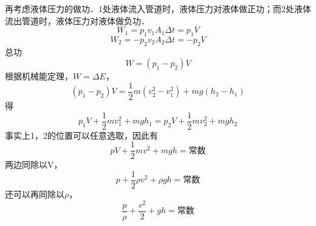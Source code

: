 再考虑液体压力的做功．1处液体流入管道时，液体压力对液体做正功；而2处液体流出管道时，液体压力对液体做负功．
\begin{equation}
W_1=p_1v_1A_1\Delta t=p_1V 
\end{equation}
\begin{equation}
W_2=-p_2v_2A_2 \Delta t=-p_2V 
\end{equation}
总功
\begin{equation}
W=(p_1-p_2)V
\end{equation}
根据机械能定理，$W=\Delta E$，
\begin{equation}
(p_1-p_2)V= \frac{1}{2}m(v_2^2-v_1^2)+mg(h_2-h_1)
\end{equation}
得
\begin{equation}
p_1V+\frac{1}{2}mv_1^2+mgh_1=p_2V+\frac{1}{2}mv_2^2+mgh_2
\end{equation}
事实上1，2的位置可以任意选取，因此有
\begin{equation}
pV+\frac{1}{2}mv^2+mgh=\text{常数}
\end{equation}
两边同除以V，
\begin{equation}
p+\frac{1}{2}\rho v^2+\rho gh=\text{常数}
\end{equation}
还可以再同除以$\rho$，
\begin{equation}
\frac{p}{\rho} + \frac{v^2}{2} + gh = \text{常数}
\end{equation}



